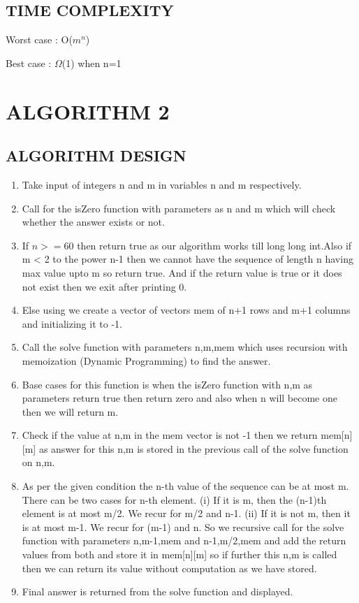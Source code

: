 \documentclass[conference]{IEEEtran}
\begin{document}
\subsection{TIME COMPLEXITY}

Worst case : O($m^{n}$)

Best case  : $\Omega$(1) when n=1

\section{ALGORITHM 2}

\subsection{ALGORITHM DESIGN}

\begin{enumerate}
\item Take input of integers n and m in variables n and m respectively. 
\item Call for the isZero function with parameters as n and m which will check whether the answer exists or not. 
\item If $n>=60$ then return true as our algorithm works till long long int.Also if m < 2 to the power n-1 then we cannot have the sequence of length n having max value upto m so return true. And if the return value is true or it does not exist then we exit after printing 0.
\item Else using we create a vector of vectors mem of n+1 rows and m+1 columns and initializing it to -1.
\item Call the solve function with parameters n,m,mem which uses recursion with memoization (Dynamic Programming) to find the answer.
\item Base cases for this function is when the isZero function with n,m as parameters return true then return zero and also when n will become one then we will return m.
\item Check if the value at n,m in the mem vector is not -1 then we return mem[n][m] as answer for this n,m is stored in the previous call of the solve function on n,m.
\item As per the given condition the n-th value of the sequence can be at most m. There can be two cases for n-th element.
\newline
   (i) If it is m, then the (n-1)th element is at most m/2. We recur for m/2 and n-1.
   \newline
   (ii) If it is not m, then it is at most m-1. We recur for (m-1) and n.
   \newline
 So we recursive call for the solve function with parameters  n,m-1,mem and n-1,m/2,mem and add the return values from both and store it in mem[n][m] so if further this n,m is called then we can  return its value without computation as we have stored.
\item Final answer is returned from the solve function and displayed.


\end{enumerate}
\end{document}
